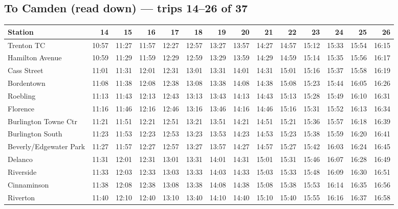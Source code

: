 \subsection*{To Camden (read down) --- trips 14--26 of 37}
\begin{center}\footnotesize\setlength{\tabcolsep}{3pt}\begin{tabular}{@{}lrrrrrrrrrrrrr@{}}\toprule
Station & 14 & 15 & 16 & 17 & 18 & 19 & 20 & 21 & 22 & 23 & 24 & 25 & 26 \\\midrule
Trenton TC & 10:57 & 11:27 & 11:57 & 12:27 & 12:57 & 13:27 & 13:57 & 14:27 & 14:57 & 15:12 & 15:33 & 15:54 & 16:15 \\
Hamilton Avenue & 10:59 & 11:29 & 11:59 & 12:29 & 12:59 & 13:29 & 13:59 & 14:29 & 14:59 & 15:14 & 15:35 & 15:56 & 16:17 \\
Cass Street & 11:01 & 11:31 & 12:01 & 12:31 & 13:01 & 13:31 & 14:01 & 14:31 & 15:01 & 15:16 & 15:37 & 15:58 & 16:19 \\
Bordentown & 11:08 & 11:38 & 12:08 & 12:38 & 13:08 & 13:38 & 14:08 & 14:38 & 15:08 & 15:23 & 15:44 & 16:05 & 16:26 \\
Roebling & 11:13 & 11:43 & 12:13 & 12:43 & 13:13 & 13:43 & 14:13 & 14:43 & 15:13 & 15:28 & 15:49 & 16:10 & 16:31 \\
Florence & 11:16 & 11:46 & 12:16 & 12:46 & 13:16 & 13:46 & 14:16 & 14:46 & 15:16 & 15:31 & 15:52 & 16:13 & 16:34 \\
Burlington Towne Ctr & 11:21 & 11:51 & 12:21 & 12:51 & 13:21 & 13:51 & 14:21 & 14:51 & 15:21 & 15:36 & 15:57 & 16:18 & 16:39 \\
Burlington South & 11:23 & 11:53 & 12:23 & 12:53 & 13:23 & 13:53 & 14:23 & 14:53 & 15:23 & 15:38 & 15:59 & 16:20 & 16:41 \\
Beverly/Edgewater Park & 11:27 & 11:57 & 12:27 & 12:57 & 13:27 & 13:57 & 14:27 & 14:57 & 15:27 & 15:42 & 16:03 & 16:24 & 16:45 \\
Delanco & 11:31 & 12:01 & 12:31 & 13:01 & 13:31 & 14:01 & 14:31 & 15:01 & 15:31 & 15:46 & 16:07 & 16:28 & 16:49 \\
Riverside & 11:33 & 12:03 & 12:33 & 13:03 & 13:33 & 14:03 & 14:33 & 15:03 & 15:33 & 15:48 & 16:09 & 16:30 & 16:51 \\
Cinnaminson & 11:38 & 12:08 & 12:38 & 13:08 & 13:38 & 14:08 & 14:38 & 15:08 & 15:38 & 15:53 & 16:14 & 16:35 & 16:56 \\
Riverton & 11:40 & 12:10 & 12:40 & 13:10 & 13:40 & 14:10 & 14:40 & 15:10 & 15:40 & 15:55 & 16:16 & 16:37 & 16:58 \\

\end{tabular}
\end{center}
